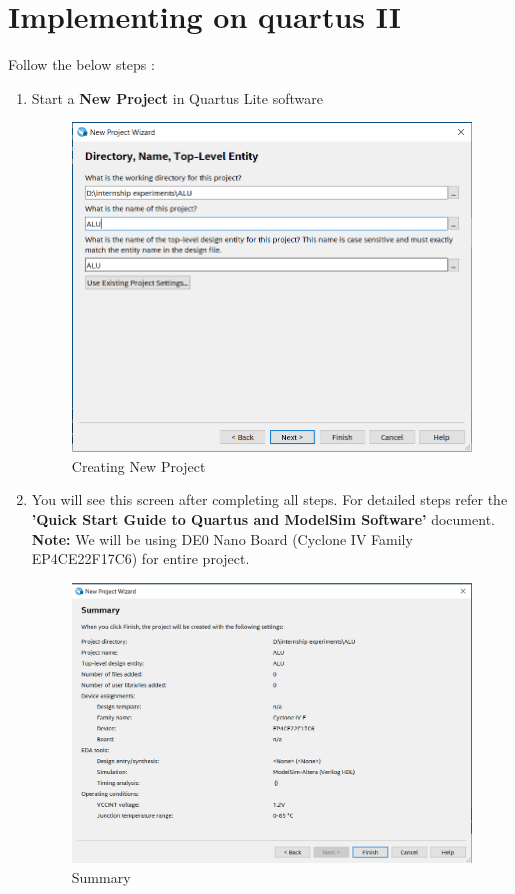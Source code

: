 \documentclass[12pt,singleside,a4paper]{article}
\begin{document}
\newpage
\section{Implementing on quartus II}
 
Follow the below steps : 

\begin{enumerate}
    \item Start a \textbf{New Project} in Quartus Lite software
    \begin{figure}[H]
    \centering
    \includegraphics[width=14cm,keepaspectratio]{PRO IMG1.png}
    \caption{Creating New Project}
    \end{figure}
    
    \newpage
    \item You will see this screen after completing all steps. For detailed steps refer the \textbf{'Quick Start Guide to Quartus and ModelSim Software'} document.
    \newline
    \textbf{Note:} We will be using DE0 Nano Board (Cyclone IV Family EP4CE22F17C6) for entire project.
    \begin{figure}[H]
    \centering
    \includegraphics[width=14cm,keepaspectratio]{projimg2.png}
    \caption{Summary}
    \end{figure}
    

\end{enumerate}
\end{document}
